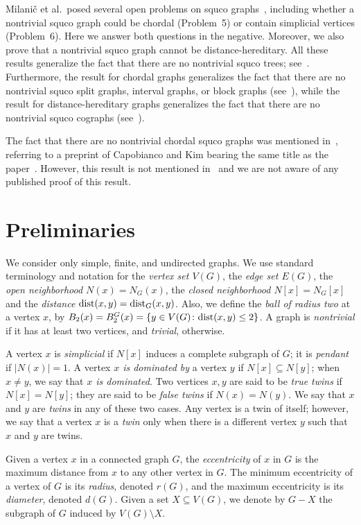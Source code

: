 \documentclass[12pt]{article}
\newcommand{\dist}{\textup{dist}}
\begin{document}
Milani\v{c} et al.~posed several open problems on squco graphs~\cite{MPPV14}, including whether a nontrivial squco graph could be chordal (Problem~5) or contain simplicial vertices (Problem~6).
Here we answer both questions in the negative.  
Moreover, we also prove that a nontrivial squco graph cannot be distance-hereditary.  
All these results generalize the fact that there are no nontrivial squco trees; see~\cite{BST94}.
Furthermore, the result for chordal graphs generalizes the fact that there are no nontrivial squco split graphs, interval graphs, or block graphs (see~\cite{MPPV14}), while the result for distance-hereditary graphs generalizes the fact that there are no nontrivial squco cographs (see~\cite{MPPV14}).

The fact that there are no nontrivial chordal squco graphs was mentioned in~\cite[p.~185]{Pri95}, referring to a preprint of Capobianco and Kim bearing the same title as the paper~\cite{CK95}.
However, this result is not mentioned in~\cite{CK95} and we are not aware of any published proof of this result.

\section{Preliminaries}

We consider only simple, finite, and undirected graphs.  
We use standard terminology and notation for the \emph{vertex set $V(G)$}, the \emph{edge set $E(G)$}, the \emph{open neighborhood $N(x)=N_{G}(x)$}, the \emph{closed neighborhood $N[x]=N_{G}[x]$} and the \emph{distance $\dist(x,y)=\dist_{G}(x,y)$}.  
Also, we define the \emph{ball of radius two} at a vertex $x$, by $B_2(x)=B_{2}^{G}(x) =\{y \in V(G)\colon \dist(x,y)\leq 2\}$. 
A graph is \emph{nontrivial} if it has at least two vertices, and \emph{trivial}, otherwise.

A vertex $x$ is \emph{simplicial} if $N[x]$ induces a complete
subgraph of $G$; it is \emph{pendant} if $|N(x)|=1$.  
A vertex \emph{$x$ is dominated by} a vertex $y$ if $N[x]\subseteq N[y]$; when $x\neq y$, we say that \emph{$x$ is dominated}.  
Two vertices $x,y$ are said to be \emph{true twins} if $N[x]=N[y]$; they are said to be \emph{false twins} if $N(x)=N(y)$.  
We say that $x$ and $y$ are \emph{twins} in any of these two cases. 
Any vertex is a twin of itself; however, we say that a vertex $x$ is a \emph{twin} only when there is a different vertex $y$ such that $x$ and $y$ are twins. 

Given a vertex $x$ in a connected graph $G$, the \emph{eccentricity} of $x$ in $G$ is the maximum distance from $x$ to any other vertex in $G$.  
The minimum eccentricity of a vertex of $G$ is its \emph{radius}, denoted $r(G)$, and the maximum eccentricity is its \emph{diameter}, denoted $d(G)$. 
Given a set $X\subseteq V(G)$, we denote by $G-X$ the subgraph of $G$ induced by $V(G)\setminus X$.
\end{document}
